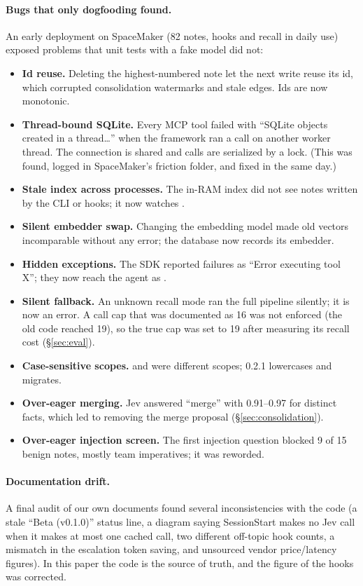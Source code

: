 \paragraph{Bugs that only dogfooding found.} An early deployment on SpaceMaker (82 notes, hooks and recall in daily use) exposed problems that unit tests with a fake model did not:
\begin{itemize}
\item \textbf{Id reuse.} Deleting the highest-numbered note let the next write reuse its id, which corrupted consolidation watermarks and stale edges. Ids are now monotonic.
\item \textbf{Thread-bound SQLite.} Every MCP tool failed with ``SQLite objects created in a thread\dots'' when the framework ran a call on another worker thread. The connection is shared and calls are serialized by a lock. (This was found, logged in SpaceMaker's friction folder, and fixed in the same day.)
\item \textbf{Stale index across processes.} The in-RAM index did not see notes written by the CLI or hooks; it now watches .
\item \textbf{Silent embedder swap.} Changing the embedding model made old vectors incomparable without any error; the database now records its embedder.
\item \textbf{Hidden exceptions.} The SDK reported failures as ``Error executing tool X''; they now reach the agent as .
\item \textbf{Silent fallback.} An unknown recall mode ran the full pipeline silently; it is now an error. A call cap that was documented as 16 was not enforced (the old code reached 19), so the true cap was set to 19 after measuring its recall cost (\S\ref{sec:eval}).
\item \textbf{Case-sensitive scopes.}  and  were different scopes; 0.2.1 lowercases and migrates.
\item \textbf{Over-eager merging.} Jev answered ``merge'' with 0.91--0.97 for distinct facts, which led to removing the merge proposal (\S\ref{sec:consolidation}).
\item \textbf{Over-eager injection screen.} The first injection question blocked 9 of 15 benign notes, mostly team imperatives; it was reworded.
\end{itemize}

\paragraph{Documentation drift.} A final audit of our own documents found several inconsistencies with the code (a stale ``Beta (v0.1.0)'' status line, a diagram saying SessionStart makes no Jev call when it makes at most one cached call, two different off-topic hook counts, a mismatch in the escalation token saving, and unsourced vendor price/latency figures). In this paper the code is the source of truth, and the figure of the hooks was corrected.
